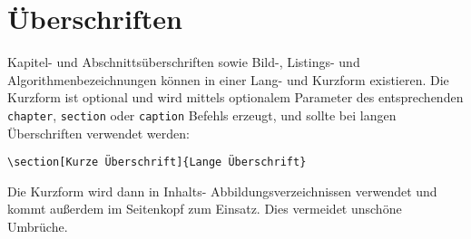 \section{Überschriften}\label{sec:ueberschriften}
%
Kapitel- und Abschnittsüberschriften sowie Bild-, Listings- und Algorithmenbezeichnungen können in einer Lang- und Kurzform existieren. Die Kurzform ist optional und wird mittels optionalem Parameter des entsprechenden \texttt{chapter}, \texttt{section} oder \texttt{caption} Befehls erzeugt, und sollte bei langen Überschriften verwendet werden:
%
\begin{center}
  \verb!\section[Kurze Überschrift]{Lange Überschrift}!
\end{center}
%
Die Kurzform wird dann in Inhalts- \bzw{} Abbildungsverzeichnissen \etc{} verwendet und kommt außerdem im Seitenkopf zum Einsatz. Dies vermeidet unschöne Umbrüche.
%
%
